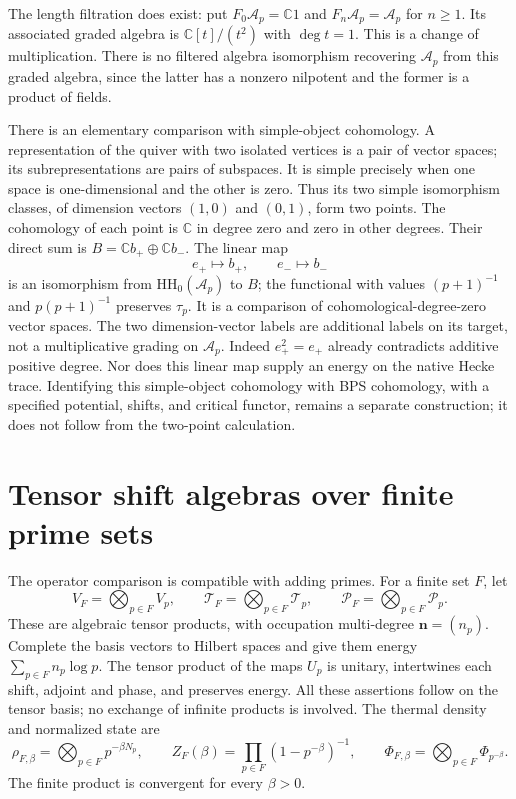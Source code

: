 The length filtration does exist: put $F_0\mathcal A_p=\mathbb C1$
and $F_n\mathcal A_p=\mathcal A_p$ for $n\geq1$. Its associated
graded algebra is
$\mathbb C[t]/(t^2)$ with $\deg t=1$. This is a change of
multiplication. There is no filtered algebra isomorphism recovering
$\mathcal A_p$ from this graded algebra, since the latter has a
nonzero nilpotent and the former is a product of fields.

There is an elementary comparison with simple-object cohomology.
A representation of the quiver with two isolated vertices is a
pair of vector spaces; its subrepresentations are pairs of
subspaces. It is simple precisely when one space is one-dimensional
and the other is zero. Thus its two simple isomorphism classes,
of dimension vectors $(1,0)$ and $(0,1)$, form two points. The
cohomology of each point is $\mathbb C$ in degree zero and zero
in other degrees. Their direct sum is
$B=\mathbb C b_+\oplus\mathbb C b_-$. The linear map
\[
 e_+\mapsto b_+,\qquad e_-\mapsto b_-
\]
is an isomorphism from $\mathrm{HH}_0(\mathcal A_p)$ to $B$;
the functional with values $(p+1)^{-1}$ and $p(p+1)^{-1}$ preserves
$\tau_p$. It is a comparison of cohomological-degree-zero vector
spaces. The two dimension-vector labels are additional labels on
its target, not a multiplicative grading on $\mathcal A_p$.
Indeed $e_+^2=e_+$ already contradicts additive positive degree.
Nor does this linear map supply an energy on the native Hecke
trace. Identifying this simple-object cohomology with BPS
cohomology, with a specified potential, shifts, and critical
functor, remains a separate construction; it does not follow
from the two-point calculation.

\section{Tensor shift algebras over finite prime sets}

The operator comparison is compatible with adding primes. For a
finite set $F$, let
\[
 V_F=\bigotimes_{p\in F}V_p,\qquad
 \mathcal T_F=\bigotimes_{p\in F}\mathcal T_p,\qquad
 \mathcal P_F=\bigotimes_{p\in F}\mathcal P_p.
\]
These are algebraic tensor products, with occupation multi-degree
$\mathbf n=(n_p)$. Complete the basis vectors to Hilbert spaces
and give them energy $\sum_{p\in F}n_p\log p$. The tensor product
of the maps $U_p$ is unitary, intertwines each shift, adjoint and
phase, and preserves energy. All these assertions follow on the
tensor basis; no exchange of infinite products is involved.
The thermal density and normalized state are
\[
 \rho_{F,\beta}=\bigotimes_{p\in F}p^{-\beta N_p},\qquad
 Z_F(\beta)=\prod_{p\in F}(1-p^{-\beta})^{-1},\qquad
 \Phi_{F,\beta}=\bigotimes_{p\in F}\Phi_{p^{-\beta}}.
\]
The finite product is convergent for every $\beta>0$.

